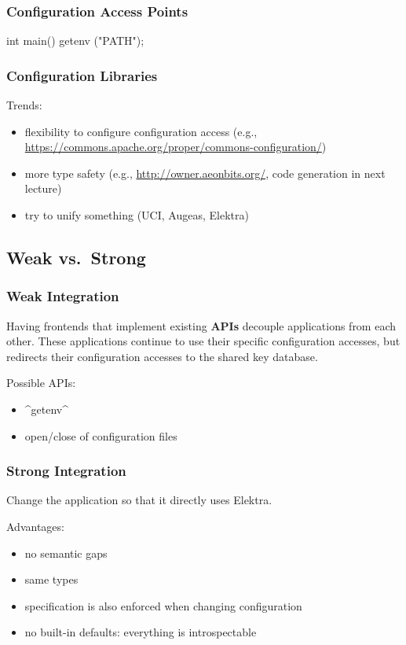 \begin{frame}[fragile]
	\frametitle{Configuration Access Points}

	\begin{code}[language=Cpp,gobble=4,showspaces=no]
	int main()
	{
		getenv ("PATH");
	}
	\end{code}
\end{frame}

\begin{frame}[fragile]
	\frametitle{Configuration Libraries}

	Trends:
	\begin{itemize}[<+-| alert@+>]
	\item flexibility to configure configuration access (e.g., \url{https://commons.apache.org/proper/commons-configuration/})
	\item more type safety (e.g., \url{http://owner.aeonbits.org/}, code generation in next lecture)
	\item try to unify something (UCI, Augeas, Elektra)
	\end{itemize}
\end{frame}

\subsection{Weak vs.\ Strong}

\begin{frame}[fragile]
	\frametitle{Weak Integration}

	Having frontends that implement existing \textbf{APIs} decouple applications from each other.
	These applications continue to use their specific configuration accesses, but \elektra{} redirects their configuration accesses to the shared key database.

	Possible APIs:
	\begin{itemize}[<+-| alert@+>]
	\item ^getenv^
	\item open/close of configuration files
	\end{itemize}
\end{frame}

\begin{frame}[fragile]
	\frametitle{Strong Integration}

	Change the application so that it directly uses Elektra.

	Advantages:
	\begin{itemize}[<+-| alert@+>]
	\item no semantic gaps
	\item same types
	\item specification is also enforced when changing configuration
	\item no built-in defaults: everything is introspectable
	\end{itemize}
\end{frame}



